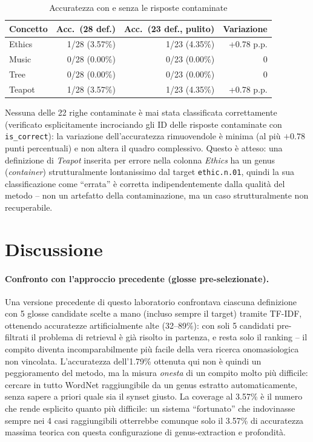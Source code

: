 \documentclass[12pt,a4paper]{article}
\begin{document}
\begin{table}[H]
  \centering
  \caption{Accuratezza con e senza le risposte contaminate}
  \begin{tabular}{lrrr}
    \toprule
    \textbf{Concetto} & \textbf{Acc.\ (28 def.)} & \textbf{Acc.\ (23 def., pulito)} & \textbf{Variazione} \\
    \midrule
    Ethics & 1/28 (3.57\%) & 1/23 (4.35\%) & +0.78 p.p. \\
    Music  & 0/28 (0.00\%) & 0/23 (0.00\%) & 0 \\
    Tree   & 0/28 (0.00\%) & 0/23 (0.00\%) & 0 \\
    Teapot & 1/28 (3.57\%) & 1/23 (4.35\%) & +0.78 p.p. \\
    \bottomrule
  \end{tabular}
\end{table}

Nessuna delle 22 righe contaminate \`e mai stata classificata correttamente (verificato esplicitamente incrociando gli ID delle risposte contaminate con \texttt{is\_correct}): la variazione dell'accuratezza rimuovendole \`e minima (al pi\`u $+0.78$ punti percentuali) e non altera il quadro complessivo. Questo \`e atteso: una definizione di \textit{Teapot} inserita per errore nella colonna \textit{Ethics} ha un genus (\textit{container}) strutturalmente lontanissimo dal target \texttt{ethic.n.01}, quindi la sua classificazione come ``errata'' \`e corretta indipendentemente dalla qualit\`a del metodo -- non un artefatto della contaminazione, ma un caso strutturalmente non recuperabile.

\section{Discussione}

\paragraph{Confronto con l'approccio precedente (glosse pre-selezionate).} Una versione precedente di questo laboratorio confrontava ciascuna definizione con 5 glosse candidate scelte a mano (incluso sempre il target) tramite TF-IDF, ottenendo accuratezze artificialmente alte (32--89\%): con soli 5 candidati pre-filtrati il problema di retrieval \`e gi\`a risolto in partenza, e resta solo il ranking -- il compito diventa incomparabilmente pi\`u facile della vera ricerca onomasiologica non vincolata. L'accuratezza dell'1.79\% ottenuta qui non \`e quindi un peggioramento del metodo, ma la misura \emph{onesta} di un compito molto pi\`u difficile: cercare in tutto WordNet raggiungibile da un genus estratto automaticamente, senza sapere a priori quale sia il synset giusto. La coverage al 3.57\% \`e il numero che rende esplicito quanto pi\`u difficile: un sistema ``fortunato'' che indovinasse sempre nei 4 casi raggiungibili otterrebbe comunque solo il 3.57\% di accuratezza massima teorica con questa configurazione di genus-extraction e profondit\`a.
\end{document}
